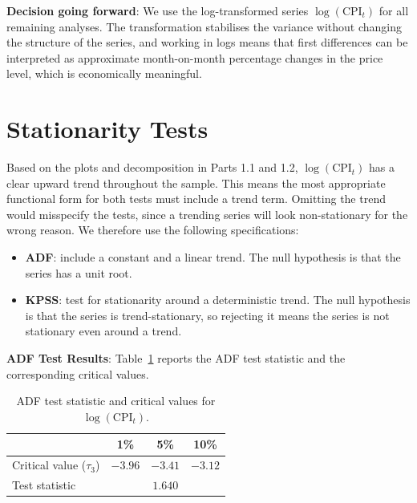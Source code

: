 


\textbf{Decision going forward}: We use the log-transformed series $\log(\text{CPI}_t)$ for all remaining analyses. The transformation stabilises the variance without changing the structure of the series, and working in logs means that first differences can be interpreted as approximate month-on-month percentage changes in the price level, which is economically meaningful.



\section{Stationarity Tests}

Based on the plots and decomposition in Parts 1.1 and 1.2, $\log(\text{CPI}_t)$ has a clear upward trend throughout the sample. This means the most appropriate functional form for both tests must include a trend term. Omitting the trend would misspecify the tests, since a trending series will look non-stationary for the wrong reason. We therefore use the following specifications:

\begin{itemize}
    \item \textbf{ADF}: include a constant and a linear trend. The null hypothesis is that the series has a unit root.
    \item \textbf{KPSS}: test for stationarity around a deterministic trend. The null hypothesis is that the series is trend-stationary, so rejecting it means the series is not stationary even around a trend.
\end{itemize}

\textbf{ADF Test Results}: Table~\ref{tab:adf} reports the ADF test statistic and the corresponding critical values.

\begin{table}[h]
\centering
\begin{tabular}{lccc}
\hline
 & 1\% & 5\% & 10\% \\
\hline
Critical value ($\tau_3$) & $-3.96$ & $-3.41$ & $-3.12$ \\
Test statistic            & \multicolumn{3}{c}{$1.640$} \\
\hline
\end{tabular}
\caption{ADF test statistic and critical values for $\log(\text{CPI}_t)$.}
\label{tab:adf}
\end{table}

